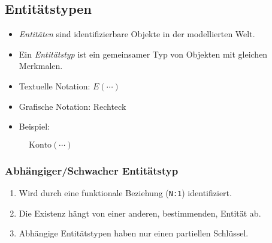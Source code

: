 		\subsection{Entitätstypen} %
			\begin{itemize}
				\item \textit{Entitäten} sind identifizierbare Objekte in der modellierten Welt.
				\item Ein \textit{Entitätstyp} ist ein gemeinsamer Typ von Objekten mit gleichen Merkmalen.
				\item Textuelle Notation: \(E(\cdots)\)
				\item Grafische Notation: Rechteck
				\item Beispiel:
			\end{itemize}
			\begin{figure}[H]
				\centering

				\( \text{Konto}(\cdots) \)

				\vspace{1cm}

			\end{figure}

			\subsubsection{Abhängiger/Schwacher Entitätstyp} %
				\begin{enumerate}
					\item Wird durch eine funktionale Beziehung (\texttt{N:1}) identifiziert.
					\item Die Existenz hängt von einer anderen, bestimmenden, Entität ab.
					\item Abhängige Entitätstypen haben nur einen partiellen Schlüssel.
				\end{enumerate}

				\begin{figure}[H]
					\centering
				\end{figure}

